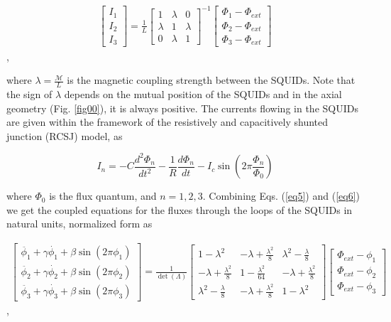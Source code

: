 \documentclass[aps,pre,reprint,groupedaddress]{revtex4-1}
\begin{document}
\begin{gather} \label{eq5}
\begin{bmatrix} I_{1} \\[2ex] I_{2} \\[2ex] I_{3} \end{bmatrix}
=
\frac{1}{L}
\begin{bmatrix}
1 & \lambda & 0  \\[2ex]
\lambda & 1 & \lambda \\[2ex]
0 & \lambda & 1
\end{bmatrix}^{-1}
\begin{bmatrix} \Phi_{1} - \Phi_{ext} \\[2ex]  \Phi_{2} - \Phi_{ext} \\[2ex] \Phi_{3} - \Phi_{ext} \end{bmatrix}
\end{gather},

where $\lambda = \frac{\mathcal{M}}{L}$ is the magnetic coupling strength between the
SQUIDs. Note that the sign of $\lambda$ depends on the mutual
position of the SQUIDs and in the axial geometry (Fig. \ref{fig00}), it is always positive. 
The currents flowing in the SQUIDs are
given within the framework of the resistively and capacitively
shunted junction (RCSJ) model, as

\begin{equation} \label{eq6}
I_{n} = -C \frac{d^{2} \Phi_{n}}{dt^{2}} - \frac{1}{R} \frac{d \Phi_{n}}{dt} - I_{c} \sin \left( 2 \pi \frac{\Phi_{n}}{\Phi_{0}} \right) 
\end{equation}

where $\Phi_{0}$ is the flux quantum, and $n = 1, 2, 3$. Combining Eqs. (\ref{eq5}) and (\ref{eq6}) we get the coupled equations for the fluxes through the loops of the SQUIDs in natural units, normalized form as

\begin{widetext}  
	\begin{gather} \label{eq7}
	\begin{bmatrix} \ddot{\phi_{1}} +\gamma \dot{\phi_{1}} +\beta \sin(2\pi \phi_{1}) \\[2ex] \ddot{\phi_{2}} +\gamma \dot{\phi_{2}} +\beta \sin(2\pi \phi_{2}) \\[2ex] \ddot{\phi_{3}} +\gamma \dot{\phi_{3}} +\beta \sin(2\pi \phi_{3}) \end{bmatrix}
	=
	\frac{1}{\det(\varLambda)}
	\begin{bmatrix}
	1-\lambda^{2} & -\lambda+\frac{\lambda^{2}}{8} & \lambda^{2} -\frac{\lambda}{8}  \\[2ex]
	-\lambda+\frac{\lambda^{2}}{8} & 1-\frac{\lambda^{2}}{64} &  -\lambda+\frac{\lambda^{2}}{8} \\[2ex]
	\lambda^{2} -\frac{\lambda}{8}  & -\lambda+\frac{\lambda^{2}}{8} & 1-\lambda^{2}
	\end{bmatrix}
	\begin{bmatrix} \varPhi_{ext} - \phi_{1} \\[2ex]  \varPhi_{ext} - \phi_{2} \\[2ex] \varPhi_{ext} - \phi_{3} \end{bmatrix}
	\end{gather},
\end{widetext}
\end{document}
